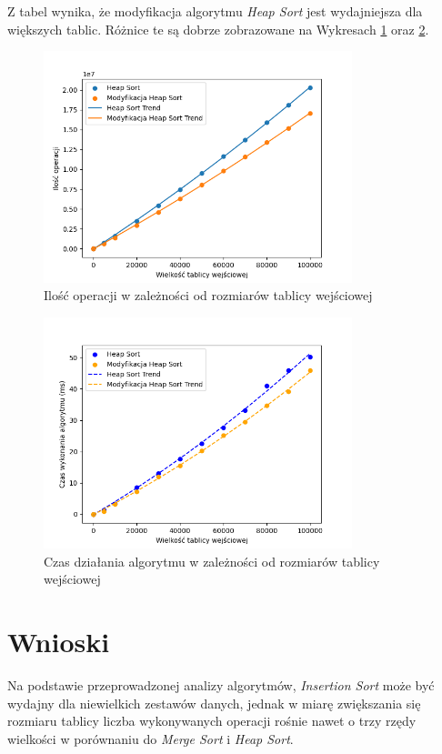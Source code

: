 \documentclass{article}
\begin{document}
Z tabel wynika, że modyfikacja algorytmu \textit{Heap Sort} jest wydajniejsza dla większych tablic. Różnice te są dobrze zobrazowane na Wykresach \ref{fig:heap} oraz \ref{fig:heapt}.

\begin{figure}[H]
    \centering
    \includegraphics[width=0.8\textwidth]{Figure_3.png}
    \caption{Ilość operacji w zależności od rozmiarów tablicy wejściowej}
    \label{fig:heap}
\end{figure}
\begin{figure}[H]
    \centering
    \includegraphics[width=0.8\textwidth]{Figure_7.png}
    \caption{Czas działania algorytmu w zależności od rozmiarów tablicy wejściowej}
    \label{fig:heapt}
\end{figure}
\section{Wnioski}
Na podstawie przeprowadzonej analizy algorytmów, \textit{Insertion Sort} może być wydajny dla niewielkich zestawów danych, jednak w miarę zwiększania się rozmiaru tablicy liczba wykonywanych operacji rośnie nawet o trzy rzędy wielkości w porównaniu do \textit{Merge Sort} i \textit{Heap Sort}.
\end{document}
